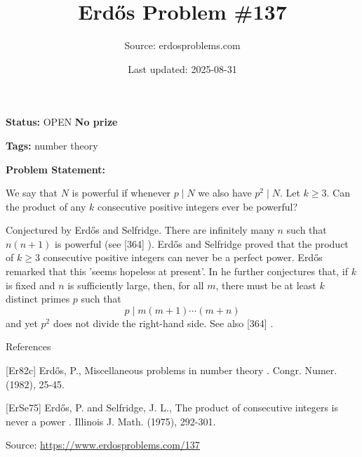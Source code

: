 \documentclass{article}
\title{Erd\H{o}s Problem \#137}
\date{Last updated: 2025-08-31}
\author{Source: erdosproblems.com}
\begin{document}
\maketitle

\noindent\textbf{Status:} OPEN \quad \textbf{No prize}

\noindent\textbf{Tags:} number theory

\medskip

\noindent\textbf{Problem Statement:}

We say that $N$ is powerful if whenever $p\mid N$ we also have $p^2\mid N$. Let $k\geq 3$. Can the product of any $k$ consecutive positive integers ever be powerful?




Conjectured by Erd\H{o}s and Selfridge. There are infinitely many $n$ such that $n(n+1)$ is powerful (see [364] ). Erd\H{o}s and Selfridge \cite{ErSe75} proved that the product of $k\geq 3$ consecutive positive integers can never be a perfect power. Erd\H{o}s remarked that this 'seems hopeless at present'. In \cite{Er82c} he further conjectures that, if $k$ is fixed and $n$ is sufficiently large, then, for all $m$, there must be at least $k$ distinct primes $p$ such that\[p\mid m(m+1)\cdots (m+n)\]and yet $p^2$ does not divide the right-hand side. See also [364] .




References

[Er82c] Erd\H{o}s, P., Miscellaneous problems in number theory . Congr. Numer. (1982), 25-45.

[ErSe75] Erd\H{o}s, P. and Selfridge, J. L., The product of consecutive integers is never a power . Illinois J. Math. (1975), 292-301.


\bigskip
\noindent\small{Source: \url{https://www.erdosproblems.com/137}}
\end{document}
